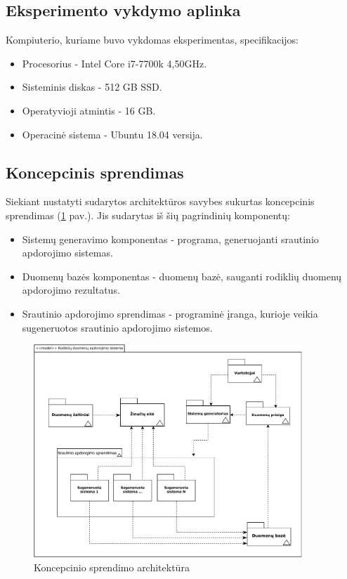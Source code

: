 \documentclass{VUMIFPSbakalaurinis}
\begin{document}
\subsection{Eksperimento vykdymo aplinka}

Kompiuterio, kuriame buvo vykdomas eksperimentas, specifikacijos:
\begin{itemize}
    \item Procesorius - Intel Core i7-7700k 4,50GHz.
    \item Sisteminis diskas -  512 GB SSD.
    \item Operatyvioji atmintis - 16 GB.
    \item Operacinė sistema - Ubuntu 18.04 versija.
\end{itemize}

\subsection{Koncepcinis sprendimas}

Siekiant nustatyti sudarytos architektūros savybes sukurtas koncepcinis sprendimas (\ref{img:concept} pav.). Jis sudarytas iš šių pagrindinių komponentų:
\begin{itemize}
    \item Sistemų generavimo komponentas - programa, generuojanti srautinio apdorojimo sistemas.
    \item Duomenų bazės komponentas - duomenų bazė, sauganti rodiklių duomenų apdorojimo rezultatus.
    \item Srautinio apdorojimo sprendimas - programinė įranga, kurioje veikia sugeneruotos srautinio apdorojimo sistemos.
\end{itemize}

\begin{figure}[H]
    \centering
    \includegraphics[width=0.9\textwidth]{img/architekturos_diagrama.pdf}
    \caption{Koncepcinio sprendimo architektūra}
    \label{img:concept}
\end{figure}
\end{document}
